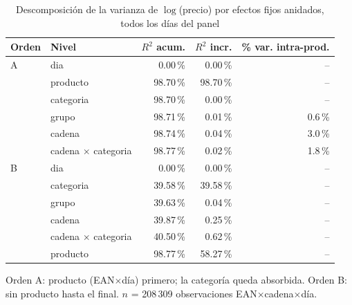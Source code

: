\begin{table}[htbp]
\caption{Descomposici\'on de la varianza de $\log$(precio) por efectos fijos anidados, todos los d\'ias del panel}
\label{tab:varianza}
\centering\scriptsize\setlength{\tabcolsep}{3pt}
\begin{tabular}{@{}llrrr@{}}
\toprule
Orden & Nivel & $R^2$ acum. & $R^2$ incr. & \% var. intra-prod. \\
\midrule
A & dia & 0.00\,\% & 0.00\,\% & -- \\
 & producto & 98.70\,\% & 98.70\,\% & -- \\
 & categoria & 98.70\,\% & 0.00\,\% & -- \\
 & grupo & 98.71\,\% & 0.01\,\% & 0.6\,\% \\
 & cadena & 98.74\,\% & 0.04\,\% & 3.0\,\% \\
 & cadena $\times$ categoria & 98.77\,\% & 0.02\,\% & 1.8\,\% \\
\midrule
B & dia & 0.00\,\% & 0.00\,\% & -- \\
 & categoria & 39.58\,\% & 39.58\,\% & -- \\
 & grupo & 39.63\,\% & 0.04\,\% & -- \\
 & cadena & 39.87\,\% & 0.25\,\% & -- \\
 & cadena $\times$ categoria & 40.50\,\% & 0.62\,\% & -- \\
 & producto & 98.77\,\% & 58.27\,\% & -- \\
\bottomrule\end{tabular}
\par\smallskip\raggedright\scriptsize Orden A: producto (EAN$\times$d\'ia) primero; la categor\'ia queda absorbida. Orden B: sin producto hasta el final. $n$ = 208\,309 observaciones EAN$\times$cadena$\times$d\'ia.
\end{table}
